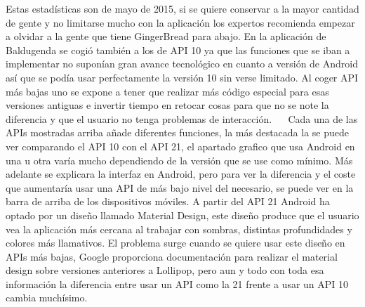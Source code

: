 Estas estadísticas son de mayo de 2015, si se quiere conservar a la mayor cantidad de gente y no limitarse mucho con la aplicación los expertos recomienda empezar a olvidar a la gente que tiene GingerBread para abajo.
En la aplicación de Baldugenda se cogió también a los de API 10 ya que las funciones que se iban a implementar no suponían gran avance tecnológico en cuanto a versión de Android así que se podía usar perfectamente la versión 10 sin verse limitado.
Al coger API más bajas uno se expone a tener que realizar más código especial para esas versiones antiguas e invertir tiempo en retocar cosas para que no se note la diferencia y que el usuario no tenga problemas de interacción.
 
Cada una de las APIs mostradas arriba añade diferentes funciones, la más destacada la se puede ver comparando el API 10 con el API 21, el apartado grafico que usa Android en una u otra varía mucho dependiendo de la versión que se use como mínimo.
Más adelante se explicara la interfaz en Android, pero para ver la diferencia y el coste que aumentaría usar una API de más bajo nivel del necesario, se puede ver en la barra de arriba de los dispositivos móviles. A partir del API 21 Android ha optado por un diseño llamado Material Design, este diseño produce que el usuario vea la aplicación más cercana al trabajar con sombras, distintas profundidades y colores más llamativos.
El problema surge cuando se quiere usar este diseño en APIs más bajas, Google proporciona documentación para realizar el material design sobre versiones anteriores a Lollipop, pero aun y todo con toda esa información la diferencia entre usar un API como la 21 frente a usar un API 10 cambia muchísimo.

